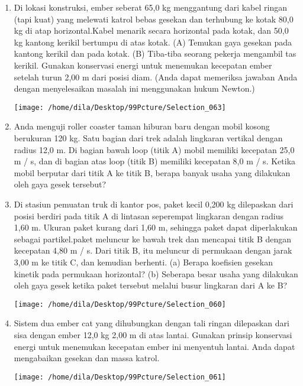 \documentclass[12pt,a4paper,draft,final,oneside,twoside,openright,openany]{article}
\begin{document}
	\begin{enumerate}
		\item Di lokasi konstruksi, ember seberat 65,0 kg menggantung dari kabel ringan (tapi kuat) yang melewati katrol bebas gesekan dan terhubung ke kotak 80,0 kg di atap horizontal.Kabel menarik secara horizontal pada kotak, dan 50,0 kg kantong kerikil bertumpu di atas kotak. (A) Temukan gaya gesekan pada kantong kerikil dan pada kotak. (B) Tiba-tiba seorang pekerja mengambil tas kerikil. Gunakan konservasi energi untuk menemukan kecepatan ember setelah turun 2,00 m dari posisi diam. (Anda dapat memeriksa jawaban Anda dengan menyelesaikan masalah ini menggunakan hukum Newton.)
		
			\begin{center}
				\texttt{[image: /home/dila/Desktop/99Pcture/Selection\_063]}
			\end{center}
		
		
		\item Anda menguji roller coaster taman hiburan baru dengan mobil kosong berukuran 120 kg. Satu bagian dari trek adalah lingkaran vertikal dengan radius 12,0 m. Di bagian bawah loop (titik A) mobil memiliki kecepatan 25,0 m / s, dan di bagian atas loop (titik B) memiliki kecepatan 8,0 m / s. Ketika mobil berputar dari titik A ke titik B, berapa banyak usaha yang dilakukan oleh gaya gesek tersebut?
	
		\item Di stasiun pemuatan truk di kantor pos, paket kecil 0,200 kg dilepaskan dari posisi berdiri pada titik A di lintasan seperempat lingkaran dengan radius 1,60 m. Ukuran paket kurang dari 1,60 m, sehingga paket dapat diperlakukan sebagai partikel.paket meluncur ke bawah trek dan mencapai titik B dengan kecepatan 4,80 m / s. Dari titik B, itu meluncur di permukaan dengan jarak 3,00 m ke titik C, dan kemudian berhenti. (a) Berapa koefisien gesekan kinetik pada permukaan horizontal? (b) Seberapa besar usaha yang dilakukan oleh gaya gesek ketika paket tersebut melalui busur lingkaran dari A ke B?
	
			\begin{center}
				\texttt{[image: /home/dila/Desktop/99Pcture/Selection\_060]}
			\end{center}
			
		\item Sistem dua ember cat yang dihubungkan dengan tali ringan dilepaskan dari sisa dengan ember 12,0 kg 2,00 m di atas lantai. Gunakan prinsip konservasi energi untuk menemukan kecepatan ember ini menyentuh lantai. Anda dapat mengabaikan gesekan dan massa katrol.
		
		\begin{center}
			\texttt{[image: /home/dila/Desktop/99Pcture/Selection\_061]}
		\end{center}
		
		
		
	\end{enumerate}
\end{document}
